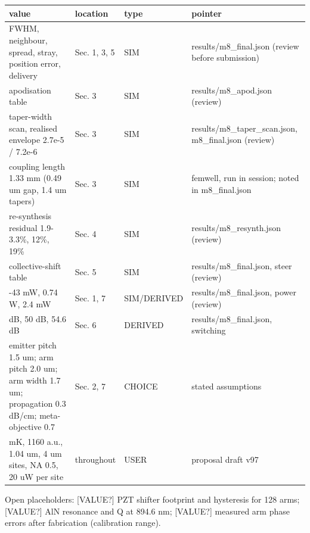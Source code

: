 {\footnotesize
\begin{longtable}[]{@{}>{\raggedright\arraybackslash}p{0.302\dimexpr(\linewidth-8\tabcolsep)\relax}>{\raggedright\arraybackslash}p{0.141\dimexpr(\linewidth-8\tabcolsep)\relax}>{\raggedright\arraybackslash}p{0.151\dimexpr(\linewidth-8\tabcolsep)\relax}>{\raggedright\arraybackslash}p{0.407\dimexpr(\linewidth-8\tabcolsep)\relax}@{}}
\toprule\noalign{}
value & location & type & pointer \\
\midrule\noalign{}
\endhead
\bottomrule\noalign{}
\endlastfoot
FWHM, neighbour, spread, stray, position error, delivery & Sec. 1, 3, 5
& SIM & results/m8\_final.json (review before submission) \\
apodisation table & Sec. 3 & SIM & results/m8\_apod.json (review) \\
taper-width scan, realised envelope 2.7e-5 / 7.2e-6 & Sec. 3 & SIM &
results/m8\_taper\_scan.json, m8\_final.json (review) \\
coupling length 1.33 mm (0.49 um gap, 1.4 um tapers) & Sec. 3 & SIM &
femwell, run in session; noted in m8\_final.json \\
re-synthesis residual 1.9-3.3\%, 12\%, 19\% & Sec. 4 & SIM &
results/m8\_resynth.json (review) \\
collective-shift table & Sec. 5 & SIM & results/m8\_final.json, steer
(review) \\
33-43 mW, 0.74 W, 2.4 mW & Sec. 1, 7 & SIM/DERIVED &
results/m8\_final.json, power (review) \\
31 dB, 50 dB, 54.6 dB & Sec. 6 & DERIVED & results/m8\_final.json,
switching \\
emitter pitch 1.5 um; arm pitch 2.0 um; arm width 1.7 um; propagation
0.3 dB/cm; meta-objective 0.7 & Sec. 2, 7 & CHOICE & stated
assumptions \\
1.2 mK, 1160 a.u., 1.04 um, 4 um sites, NA 0.5, 20 uW per site &
throughout & USER & proposal draft v97 \\
\end{longtable}
}

Open placeholders: {[}VALUE?{]} PZT shifter footprint and hysteresis for
128 arms; {[}VALUE?{]} AlN resonance and Q at 894.6 nm; {[}VALUE?{]}
measured arm phase errors after fabrication (calibration range).
